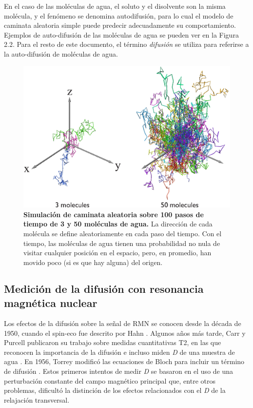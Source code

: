 \documentclass[12pt,a5,twoside]{book}
\begin{document}
En el caso de las moléculas de agua, el soluto y el disolvente son la misma molécula, y el fenómeno se denomina autodifusión, para lo cual el modelo de caminata aleatoria simple puede predecir adecuadamente su comportamiento. Ejemplos de auto-difusión de las moléculas de agua se pueden ver en la Figura 2.2. Para el resto de este documento, el término {\it difusión} se utiliza para referirse a la auto-difusión de moléculas de agua.

\begin{figure}
	\centering
    \includegraphics [scale=0.9,center] {isotropicExamples.eps}
    \caption{\textbf{Simulación de caminata aleatoria sobre 100 pasos de tiempo de 3 y 50 moléculas de agua.} La dirección de cada molécula se define aleatoriamente en cada paso del tiempo. Con el tiempo, las moléculas de agua tienen una probabilidad no nula de visitar cualquier posición en el espacio, pero, en promedio, han movido poco (si es que hay alguna) del origen.}
\end{figure}

\subsection{Medición de la difusión con resonancia\\ magnética nuclear}

Los efectos de la difusión sobre la señal de RMN se conocen desde la década de 1950, cuando el spin-eco fue descrito por Hahn \citep{Hahn_1950}. Algunos años más tarde, Carr y Purcell publicaron su trabajo sobre medidas cuantitativas T2, en las que reconocen la importancia de la difusión e incluso miden {\it D} de una muestra de agua \citep{Carr_1954}. En 1956, Torrey modificó las ecuaciones de Bloch para incluir un término de difusión \citep{Torrey_1956}. Estos primeros intentos de medir {\it D} se basaron en el uso de una perturbación constante del campo magnético principal que, entre otros problemas, dificultó la distinción de los efectos relacionados con el {\it D} de la relajación transversal.
\end{document}
